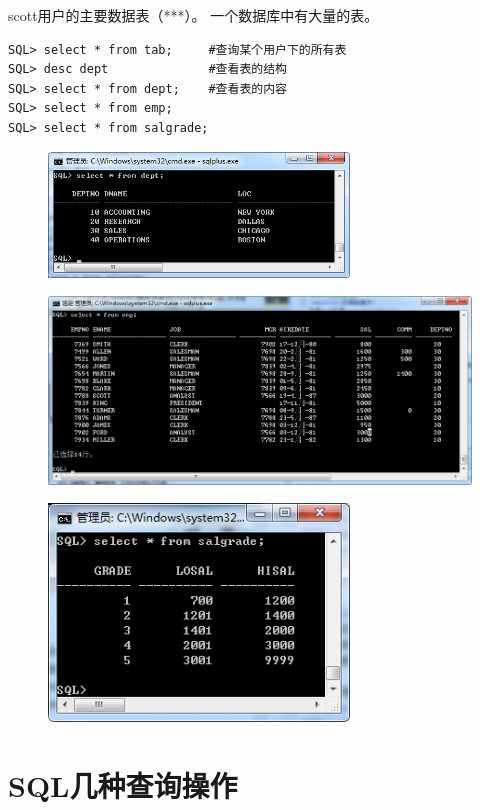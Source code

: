 scott用户的主要数据表（***）。  一个数据库中有大量的表。
\begin{verbatim}
SQL> select * from tab;     #查询某个用户下的所有表
SQL> desc dept              #查看表的结构
SQL> select * from dept;    #查看表的内容
SQL> select * from emp;
SQL> select * from salgrade;
\end{verbatim}
\begin{figure}[H]
  \centering
  \includegraphics[width=8cm]{oracle/table_dept.png}
\end{figure}
\begin{figure}[H]
  \centering
  \includegraphics[width=14cm]{oracle/table_emp.png}
\end{figure}
\begin{figure}[H]
  \centering
  \includegraphics[width=8cm]{oracle/table_salgrade.png}
\end{figure}

\section{SQL几种查询操作}

